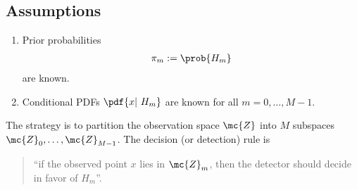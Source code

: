 \subsection*{Assumptions}
\begin{enumerate}
    \item Prior probabilities 
    \begin{align}
        \pi_{m} := \prob{H_{m}}
    \end{align}
    are known.
    \item Conditional PDFs $\pdf{x|~H_{m}}$ are known for all $m = 0, \ldots, M - 1$.
\end{enumerate}
The strategy is to partition the observation space $\mc{Z}$ into $M$ subspaces $\mc{Z}_{0}, \ldots, \mc{Z}_{M-1}$. The decision (or detection) rule is
\begin{quotation}
    ``if the observed point $x$ lies in $\mc{Z}_{m}$, then the detector should decide in favor of $H_{m}$''.
\end{quotation}

